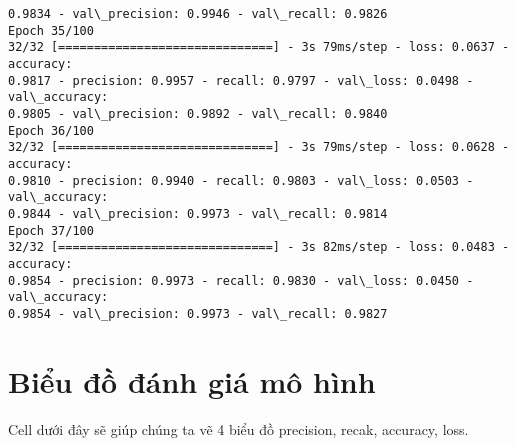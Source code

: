 \documentclass[11pt]{article}
\begin{document}
\begin{Verbatim}[commandchars=\\\{\}]
0.9834 - val\_precision: 0.9946 - val\_recall: 0.9826
Epoch 35/100
32/32 [==============================] - 3s 79ms/step - loss: 0.0637 - accuracy:
0.9817 - precision: 0.9957 - recall: 0.9797 - val\_loss: 0.0498 - val\_accuracy:
0.9805 - val\_precision: 0.9892 - val\_recall: 0.9840
Epoch 36/100
32/32 [==============================] - 3s 79ms/step - loss: 0.0628 - accuracy:
0.9810 - precision: 0.9940 - recall: 0.9803 - val\_loss: 0.0503 - val\_accuracy:
0.9844 - val\_precision: 0.9973 - val\_recall: 0.9814
Epoch 37/100
32/32 [==============================] - 3s 82ms/step - loss: 0.0483 - accuracy:
0.9854 - precision: 0.9973 - recall: 0.9830 - val\_loss: 0.0450 - val\_accuracy:
0.9854 - val\_precision: 0.9973 - val\_recall: 0.9827
    \end{Verbatim}

    \section{Biểu đồ đánh giá mô hình}\label{visualizing-model-performance}

Cell dưới đây sẽ giúp chúng ta vẽ 4 biểu đồ precision, recak, accuracy, loss.
\end{document}
